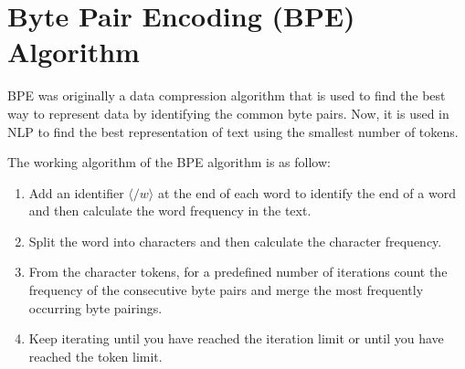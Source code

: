 \section{Byte Pair Encoding (BPE) Algorithm}
BPE was originally a data compression algorithm that is used to find the best way to represent data by identifying the common byte pairs. Now, it is used in NLP to find the best representation of text using the smallest number of tokens.

The working algorithm of the BPE algorithm is as follow:
\begin{enumerate}
    \item Add an identifier $\langle /w \rangle$ at the end of each word to identify the end of a word and then calculate the word frequency in the text.
    \item Split the word into characters and then calculate the character frequency.
    \item From the character tokens, for a predefined number of iterations count the frequency of the consecutive byte pairs and merge the most frequently occurring byte pairings.
    \item Keep iterating until you have reached the iteration limit or until you have reached the token limit.
\end{enumerate}


